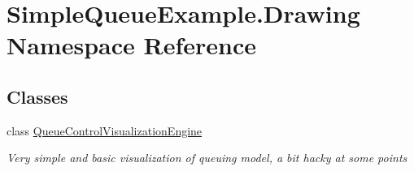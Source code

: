 \hypertarget{namespace_simple_queue_example_1_1_drawing}{}\section{Simple\+Queue\+Example.\+Drawing Namespace Reference}
\label{namespace_simple_queue_example_1_1_drawing}
\subsection*{Classes}
\begin{DoxyCompactItemize}
\item 
class \hyperlink{class_simple_queue_example_1_1_drawing_1_1_queue_control_visualization_engine}{Queue\+Control\+Visualization\+Engine}
\begin{DoxyCompactList}\small\item\em Very simple and basic visualization of queuing model, a bit hacky at some points \end{DoxyCompactList}\end{DoxyCompactItemize}
